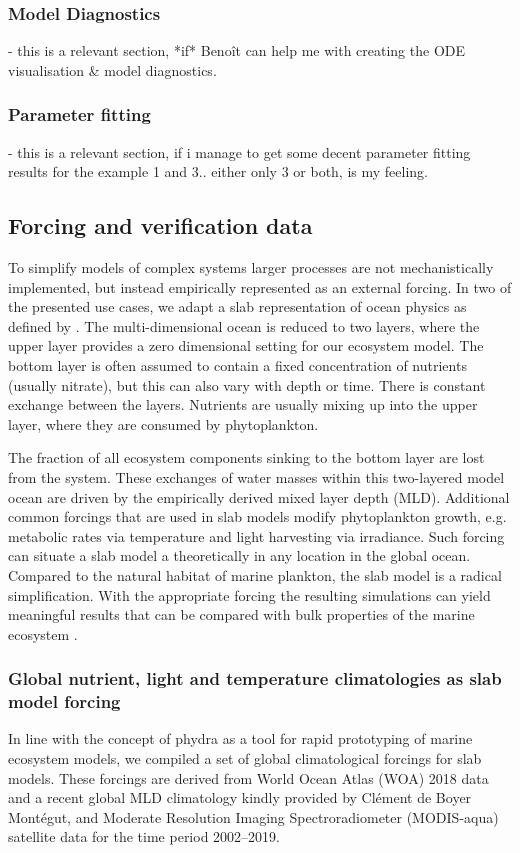\documentclass[template.tex]{subfiles}
\begin{document}
\subsubsection{Model Diagnostics}
- this is a relevant section, *if* Benoît can help me with creating the ODE visualisation & model diagnostics.

\subsubsection{Parameter fitting}
- this is a relevant section, if i manage to get some decent parameter fitting results for the example 1 and 3.. either only 3 or both, is my feeling. 



\subsection{Forcing and verification data} \label{Section:ForcingSection}

To simplify models of complex systems larger processes are not mechanistically implemented, but instead empirically represented as an external forcing. In two of the presented use cases, we adapt a slab representation of ocean physics as defined by \citet{Evans1985ACycles}. The multi-dimensional ocean is reduced to two layers, where the upper layer provides a zero dimensional setting for our ecosystem model. The bottom layer is often assumed to contain a fixed concentration of nutrients (usually nitrate), but this can also vary with depth or time. There is constant exchange between the layers. Nutrients are usually mixing up into the upper layer, where they are consumed by phytoplankton. 

The fraction of all ecosystem components sinking to the bottom layer are lost from the system. These exchanges of water masses within this two-layered model ocean are driven by the empirically derived mixed layer depth (MLD). Additional common forcings that are used in slab models modify phytoplankton growth, e.g. metabolic rates via temperature and light harvesting via irradiance. Such forcing can situate a slab model a theoretically in any location in the global ocean. Compared to the natural habitat of marine plankton, the slab model is a radical simplification. With the appropriate forcing the resulting simulations can yield meaningful results that can be compared with bulk properties of the marine ecosystem \cite[e.g.][]{Evans1985ACycles, Fasham1990a}. 

\subsubsection{Global nutrient, light and temperature climatologies as slab model forcing}
In line with the concept of phydra as a tool for rapid prototyping of marine ecosystem models, we compiled a set of global climatological forcings for slab models. These forcings are derived from World Ocean Atlas (WOA) 2018 data and a recent global MLD climatology kindly provided by Clément de Boyer Montégut, and Moderate Resolution Imaging Spectroradiometer (MODIS-aqua) satellite data for the time period 2002–2019.
\end{document}
